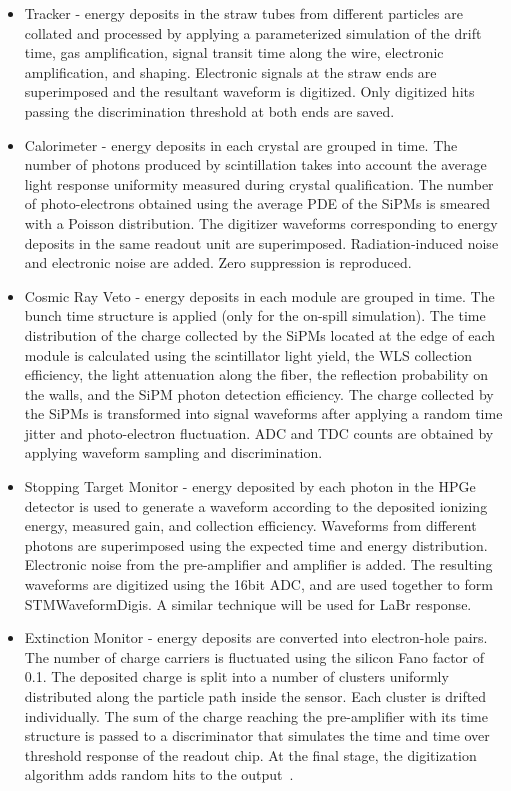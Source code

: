 \begin{itemize}
\item{Tracker -} energy deposits in the straw tubes from different particles are collated and processed by applying a parameterized simulation of the drift time, gas amplification, signal transit time along the wire, electronic amplification, and shaping. Electronic signals at the straw ends are superimposed and the resultant waveform is digitized. Only digitized hits passing the discrimination threshold at both ends are saved. 

\item{Calorimeter -} energy deposits in each crystal are grouped in time. The number of photons produced by scintillation takes into account the average light response uniformity measured during crystal qualification. The number of photo-electrons obtained using the average PDE of the SiPMs is smeared with a Poisson distribution. The digitizer waveforms corresponding to energy deposits in the same readout unit are superimposed. Radiation-induced noise and electronic noise are added. Zero suppression is reproduced.

\item{Cosmic Ray Veto -} energy deposits in each module are grouped in time. The bunch time structure is applied (only for the on-spill simulation). The time distribution of the charge collected by the SiPMs located at the edge of each module is calculated using the scintillator light yield, the WLS collection efficiency, the light attenuation along the fiber, the reflection probability on the walls, and the SiPM photon detection efficiency. The charge collected by the SiPMs is transformed into signal waveforms after applying a random time jitter and photo-electron fluctuation. ADC and TDC counts are obtained by applying waveform sampling and discrimination. 

\item{Stopping Target Monitor -} energy deposited by each photon in the HPGe detector is used to generate a waveform according to the deposited ionizing energy, measured gain, and collection efficiency. Waveforms from different photons are superimposed using the expected time and energy distribution. Electronic noise from the pre-amplifier and amplifier is added. The resulting waveforms are digitized using the 16bit ADC, and are used together to form STMWaveformDigis. A similar technique will be used for LaBr response.

\item{Extinction Monitor -} energy deposits are converted into electron-hole pairs. The number of charge carriers is fluctuated using the silicon Fano factor of 0.1. The deposited charge is split into a number of clusters uniformly distributed along the particle path inside the sensor. Each cluster is drifted individually. The sum of the charge reaching the pre-amplifier with its time structure is passed to a discriminator that simulates the time and time over threshold response of the readout chip. At the final stage, the digitization algorithm adds random hits to the output~\cite{ExtMon:2014}.
\end{itemize}


